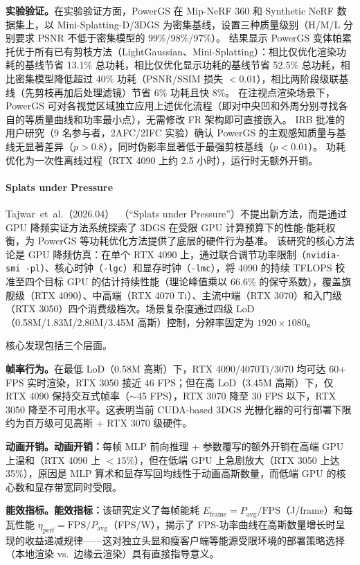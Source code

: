 \textbf{实验验证。}在实验验证方面，PowerGS 在 Mip-NeRF 360 和 Synthetic NeRF 数据集上，以 Mini-Splatting-D/3DGS 为密集基线，设置三种质量级别（H/M/L 分别要求 PSNR 不低于密集模型的 99\%/98\%/97\%）。
结果显示 PowerGS 变体帕累托优于所有已有剪枝方法（LightGaussian、Mini-Splatting）：相比仅优化渲染功耗的基线节省 13.1\% 总功耗，相比仅优化显示功耗的基线节省 52.5\% 总功耗，相比密集模型降低超过 40\% 功耗（PSNR/SSIM 损失 $< 0.01$），相比两阶段级联基线（先剪枝再加后处理滤镜）节省 6\% 功耗且快 8\%。
在注视点渲染场景下，PowerGS 可对各视觉区域独立应用上述优化流程（即对中央凹和外周分别寻找各自的等质量曲线和功率最小点），无需修改 FR 架构即可直接嵌入。
IRB 批准的用户研究（9 名参与者，2AFC/2IFC 实验）确认 PowerGS 的主观感知质量与基线无显著差异（$p > 0.8$），同时伪影率显著低于最强剪枝基线（$p < 0.01$）。
功耗优化为一次性离线过程（RTX 4090 上约 2.5 小时），运行时无额外开销。

\paragraph{Splats under Pressure}
Tajwar~et~al.（2026.04）~\cite{2604_07177}（``Splats under Pressure''）不提出新方法，而是通过 GPU 降频实证方法系统探索了 3DGS 在受限 GPU 计算预算下的性能-能耗权衡，为 PowerGS 等功耗优化方法提供了底层的硬件行为基准。
该研究的核心方法论是 GPU 降频仿真：在单个 RTX 4090 上，通过联合调节功率限制（\texttt{nvidia-smi -pl}）、核心时钟（\texttt{-lgc}）和显存时钟（\texttt{-lmc}），将 4090 的持续 TFLOPS 校准至四个目标 GPU 的估计持续性能（理论峰值乘以 66.6\% 的保守系数），覆盖旗舰级（RTX 4090）、中高端（RTX 4070 Ti）、主流中端（RTX 3070）和入门级（RTX 3050）四个消费级档次。场景复杂度通过四级 LoD（0.58M/1.83M/2.80M/3.45M 高斯）控制，分辨率固定为 $1920 \times 1080$。

核心发现包括三个层面。

\textbf{帧率行为。}在最低 LoD（0.58M 高斯）下，RTX 4090/4070Ti/3070 均可达 60+ FPS 实时渲染，RTX 3050 接近 46 FPS；但在高 LoD（3.45M 高斯）下，仅 RTX 4090 保持交互式帧率（$\sim$45 FPS），RTX 3070 降至 30 FPS 以下，RTX 3050 降至不可用水平。这表明当前 CUDA-based 3DGS 光栅化器的可行部署下限约为百万级可见高斯 + RTX 3070 级硬件。

\textbf{动画开销。}\textbf{动画开销：}每帧 MLP 前向推理 + 参数覆写的额外开销在高端 GPU 上温和（RTX 4090 上 $< 15\%$），但在低端 GPU 上急剧放大（RTX 3050 上达 35\%），原因是 MLP 算术和显存写回均线性于动画高斯数量，而低端 GPU 的核心数和显存带宽同时受限。

\textbf{能效指标。}\textbf{能效指标：}该研究定义了每帧能耗 $E_\text{frame} = P_\text{avg}/\text{FPS}$（J/frame）和每瓦性能 $\eta_\text{perf} = \text{FPS}/P_\text{avg}$（FPS/W），揭示了 FPS-功率曲线在高斯数量增长时呈现的收益递减规律——这对独立头显和瘦客户端等能源受限环境的部署策略选择（本地渲染 vs.\ 边缘云渲染）具有直接指导意义。


